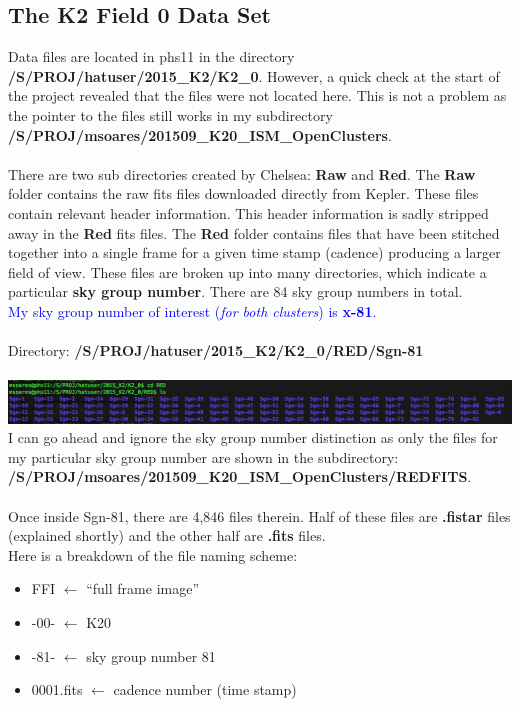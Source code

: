 \documentclass[11pt,letterpaper]{book} %
\begin{document}
\subsection*{The K2 Field 0 Data Set}
Data files are located in phs11 in the directory \textbf{/S/PROJ/hatuser/2015\_K2/K2\_0}. However, a quick check at the start of the project revealed that the files were not located here. This is not a problem as the pointer to the files still works in my subdirectory \\ \textbf{/S/PROJ/msoares/201509\_K20\_ISM\_OpenClusters}.
\\ \\
There are two sub directories created by Chelsea: \textbf{Raw} and \textbf{Red}. The \textbf{Raw} folder contains the raw fits files downloaded directly from Kepler. These files contain relevant header information. This header information is sadly stripped away in the \textbf{Red} fits files. The \textbf{Red} folder contains files that have been stitched together into a single frame for a given time stamp (cadence) producing a larger field of view. These files are broken up into many directories, which indicate a particular \textbf{sky group number}. There are 84 sky group numbers in total.\\ \textcolor{blue}{My sky group number of interest (\textit{for both clusters}) is \textbf{x-81}.} \\ \\ Directory: \textbf{/S/PROJ/hatuser/2015\_K2/K2\_0/RED/Sgn-81}\\ \\ 
\includegraphics[width=\textwidth]{subdir.png}\\
I can go ahead and ignore the sky group number distinction as only the files for my particular sky group number are shown in the subdirectory: \\
\textbf{/S/PROJ/msoares/201509\_K20\_ISM\_OpenClusters/REDFITS}.\\ \\
Once inside Sgn-81, there are 4,846 files therein. 
Half of these files are \textbf{.fistar} files (explained shortly) and the other half are \textbf{.fits} files.\\
Here is a breakdown of the file naming scheme:
\begin{itemize}
\item FFI $\leftarrow$ ``full frame image''
\item -00- $\leftarrow$ K20
\item -81- $\leftarrow$ sky group number 81
\item 0001.fits $\leftarrow$ cadence number (time stamp) 
\end{itemize}
\end{document}
